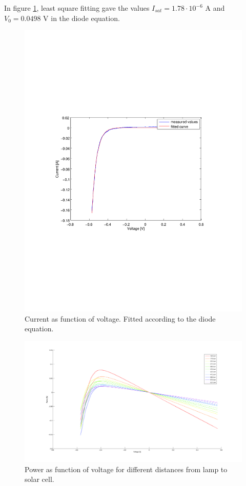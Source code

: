 \documentclass[a4paper]{article}
\begin{document}
\iffalse
In figure \ref{ivsun}, least square fitting gave the values $I_{sat}=1.78\cdot 10^{-6}$ A and $V_0=0.0498$ V in the diode equation.
\begin{figure}[h!]
  \begin{center}
    \includegraphics[scale=0.2]{IvsUnoIlumination}
  \end{center}
  \caption{Current as function of voltage. Fitted according to the diode equation.}
  \label{ivsun}
\end{figure}

\begin{figure}[h!]
  \begin{center}
    \includegraphics[scale=0.2]{PvsV}
  \end{center}
  \caption{Power as function of voltage for different distances from lamp to solar cell.}
  \label{pvsv}
\end{figure}
\end{document}
